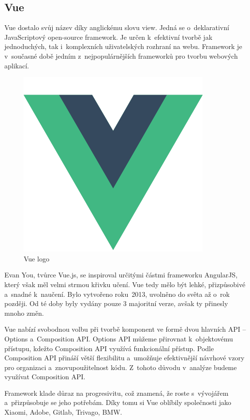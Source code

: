 \subsection{Vue}


Vue dostalo svůj název díky anglickému slovu view. Jedná se o~deklarativní JavaScriptový open-source framework. 
Je určen k~efektivní tvorbě jak jednoduchých, tak i~komplexních uživatelských rozhraní na webu. 
Framework je v~současné době jedním z~nejpopulárnějších frameworků pro tvorbu webových aplikací.\cite{vuemacrae,vue}

\begin{figure}[htb]
	\centering
		\includegraphics[width=.3\textwidth]{images/vue-logo.png}
	\caption[Vue logo]{Vue logo \cite{vue}}
	\label{fig:vuelogo}
\end{figure}

Evan You, tvůrce Vue.js, se inspiroval určitými částmi frameworku AngularJS, který však měl velmi strmou křivku učení. 
Vue tedy mělo být lehké, přizpůsobivé a~snadné k~naučení. Bylo vytvořeno roku~2013, uvolněno do světa až o~rok později. 
Od té doby byly vydány pouze 3 majoritní verze, avšak ty přinesly mnoho změn.\cite{vueflexiple,vuemedium}

Vue nabízí svobodnou volbu při tvorbě komponent ve formě dvou hlavních API -- Options a~Composition API. 
Options API můžeme přirovnat k~objektovému přístupu, kdežto Composition API využívá funkcionální přístup. 
Podle \cite{vue} Composition API přináší větší flexibilitu a~umožňuje efektivnější návrhové vzory pro organizaci a~znovupoužitelnost kódu. 
Z~tohoto důvodu v~analýze budeme využívat Composition API.

Framework klade důraz na progresivitu, což znamená, že roste s~vývojářem a~přizpůsobuje se jeho potřebám. 
Díky tomu si Vue oblíbily společnosti jako Xiaomi, Adobe, Gitlab, Trivago, BMW.\cite{vuetriodev,vue}

